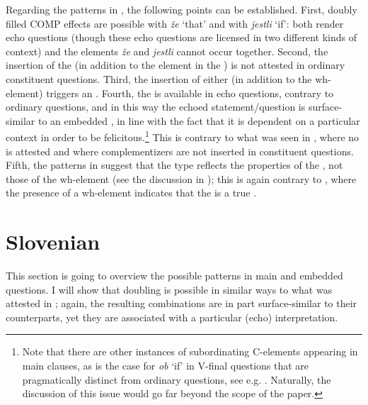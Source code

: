 \documentclass[output=paper,modfonts, hidelinks, newtxmath]{langscibook}
\begin{document}
\ea
	\z 
\z 

\noindent Regarding the  patterns in , the following points can be established. First, doubly filled COMP effects are possible with \textit{že} `that' and with \textit{jestli} `if': both render echo questions (though these echo questions are licensed in two different kinds of context) and the elements \textit{že} and \textit{jestli} cannot occur together. Second, the insertion of the  (in addition to the element in the ) is not attested in ordinary constituent questions. Third, the insertion of either  (in addition to the wh-element) triggers an . Fourth, the  is available in  echo questions, contrary to ordinary  questions, and in this way the echoed statement/question is surface-similar to an embedded , in line with the fact that it is dependent on a particular context in order to be felicitous.\footnote{Note that there are other instances of subordinating C-elements appearing in main clauses, as is the case for  \textit{ob} `if' in V-final  questions that are pragmatically distinct from ordinary questions, see e.g. \citet{zimmermann2013}. Naturally, the discussion of this issue would go far beyond the scope of the  paper.} This is contrary to what was seen in , where no  is attested and where complementizers are not inserted in  constituent questions. Fifth, the patterns in  suggest that the  type reflects the properties of the , not those of the wh-element (see the discussion in ); this is again contrary to , where the presence of a wh-element indicates that the  is a true .

\section{Slovenian}
This section is going to overview the possible patterns in  main and embedded questions. I will show that doubling is possible in similar ways to what was attested in ; again, the resulting combinations are in part surface-similar to their  counterparts, yet they are associated with a particular (echo) interpretation.
\end{document}
